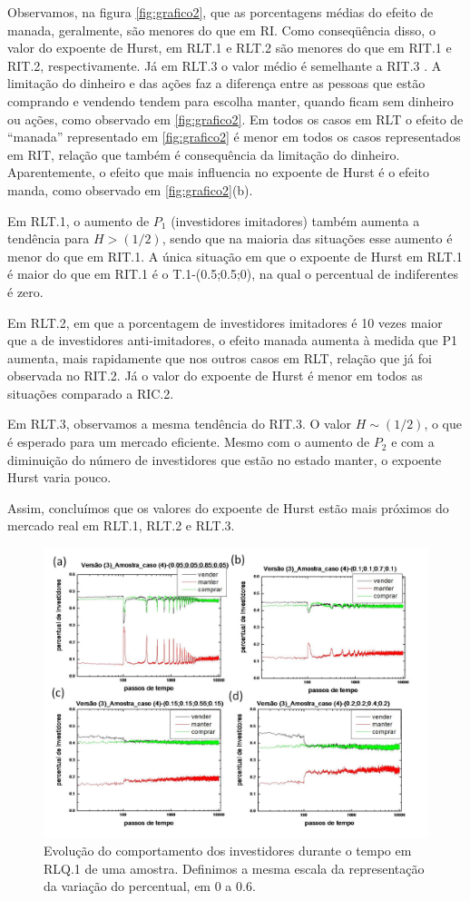 \documentclass[brazil,ruledheader]{abnt}
\begin{document}
Observamos, na figura \ref{fig:grafico2}, que as porcentagens médias do
efeito de manada, geralmente, são menores do que em RI. Como conseqüência disso,
o valor do expoente de Hurst, em RLT.1 e RLT.2 são menores do que em RIT.1 e
RIT.2, respectivamente.  Já em RLT.3  o valor médio é semelhante a RIT.3 .   A
limitação do dinheiro e das ações faz a diferença entre as pessoas que estão
comprando e vendendo tendem para escolha manter, quando ficam sem dinheiro ou
ações, como observado em \ref{fig:grafico2}. Em todos os casos em RLT o
efeito de “manada” representado em \ref{fig:grafico2} é menor em todos os casos
representados em RIT, relação que também é consequência da limitação do
dinheiro. Aparentemente, o efeito
que mais influencia no expoente de Hurst é o efeito manda, como observado em
\ref{fig:grafico2}(b).

Em RLT.1, o aumento de $P_1$ (investidores imitadores) também aumenta a
tendência para $H>(1/2)$, sendo que na maioria das situações esse aumento é
menor
do que em RIT.1. A única situação em que o expoente de Hurst em RLT.1 é maior do
que em RIT.1 é o T.1-(0.5;0.5;0), na qual o percentual de indiferentes é zero. 

Em RLT.2, em que a porcentagem de investidores imitadores é 10 vezes maior que a
de investidores anti-imitadores, o efeito manada aumenta à medida que P1
aumenta, mais rapidamente que nos outros casos em RLT, relação que já foi
observada no RIT.2. Já o valor do expoente de Hurst é menor em todos as
situações comparado a RIC.2. 


Em RLT.3, observamos a mesma tendência do RIT.3. O valor $H\sim (1/2)$, o que é
esperado para um mercado eficiente. Mesmo com o aumento de $P_2$ e com a
diminuição do número de investidores que estão no estado manter, o expoente
Hurst varia pouco.


Assim, concluímos que os valores do expoente de Hurst estão mais próximos do
mercado real em RLT.1, RLT.2 e RLT.3.

\begin{figure}[!h]
\centering
\includegraphics[width=0.8\linewidth]{Figuras/18.jpg}
\caption[Evolução do comportamento dos investidores em RLQ.1]{Evolução do
comportamento dos investidores durante o tempo em RLQ.1 de uma amostra.
Definimos a mesma escala da representação da variação do percentual, em 0 a 0.6.
}
\label{fig:evolucao-comp-investidores3}
\end{figure}
\end{document}
